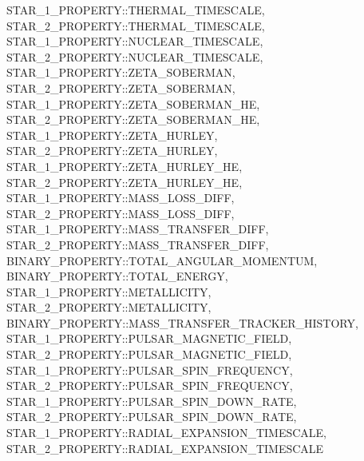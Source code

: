 \hfill
\begin{minipage}{\dimexpr\textwidth-2em} 
    STAR\_1\_PROPERTY::THERMAL\_TIMESCALE, \\
    STAR\_2\_PROPERTY::THERMAL\_TIMESCALE, \\
    STAR\_1\_PROPERTY::NUCLEAR\_TIMESCALE, \\
    STAR\_2\_PROPERTY::NUCLEAR\_TIMESCALE, \\
    STAR\_1\_PROPERTY::ZETA\_SOBERMAN, \\
    STAR\_2\_PROPERTY::ZETA\_SOBERMAN, \\
    STAR\_1\_PROPERTY::ZETA\_SOBERMAN\_HE, \\
    STAR\_2\_PROPERTY::ZETA\_SOBERMAN\_HE, \\
    STAR\_1\_PROPERTY::ZETA\_HURLEY, \\
    STAR\_2\_PROPERTY::ZETA\_HURLEY, \\
    STAR\_1\_PROPERTY::ZETA\_HURLEY\_HE, \\
    STAR\_2\_PROPERTY::ZETA\_HURLEY\_HE, \\
    STAR\_1\_PROPERTY::MASS\_LOSS\_DIFF, \\
    STAR\_2\_PROPERTY::MASS\_LOSS\_DIFF, \\
    STAR\_1\_PROPERTY::MASS\_TRANSFER\_DIFF, \\
    STAR\_2\_PROPERTY::MASS\_TRANSFER\_DIFF, \\
    BINARY\_PROPERTY::TOTAL\_ANGULAR\_MOMENTUM, \\
    BINARY\_PROPERTY::TOTAL\_ENERGY, \\
    STAR\_1\_PROPERTY::METALLICITY, \\
    STAR\_2\_PROPERTY::METALLICITY, \\
    BINARY\_PROPERTY::MASS\_TRANSFER\_TRACKER\_HISTORY, \\
    STAR\_1\_PROPERTY::PULSAR\_MAGNETIC\_FIELD, \\
    STAR\_2\_PROPERTY::PULSAR\_MAGNETIC\_FIELD, \\
    STAR\_1\_PROPERTY::PULSAR\_SPIN\_FREQUENCY, \\
    STAR\_2\_PROPERTY::PULSAR\_SPIN\_FREQUENCY, \\
    STAR\_1\_PROPERTY::PULSAR\_SPIN\_DOWN\_RATE, \\
    STAR\_2\_PROPERTY::PULSAR\_SPIN\_DOWN\_RATE, \\
    STAR\_1\_PROPERTY::RADIAL\_EXPANSION\_TIMESCALE, \\
    STAR\_2\_PROPERTY::RADIAL\_EXPANSION\_TIMESCALE
\end{minipage}
\par\rcb{;}

